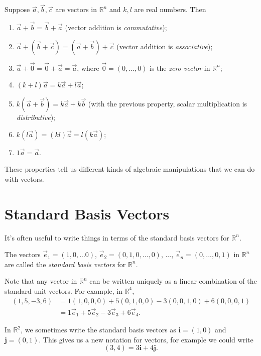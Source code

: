 \documentclass{ximera}
\begin{document}
\begin{proposition}
Suppose $\vec{a},\vec{b},\vec{c}$ are vectors in $\mathbb{R}^n$ and $k,l$ are real numbers. Then 
\begin{enumerate}
\item $\vec{a}+\vec{b} = \vec{b}+\vec{a}$ (vector addition is \emph{commutative});
\item $\vec{a}+(\vec{b}+\vec{c}) = (\vec{a}+\vec{b})+\vec{c}$ (vector addition is \emph{associative});
\item $\vec{a}+\vec{0} = \vec{0}+\vec{a} = \vec{a}$, where $\vec{0} = (0,...,0)$ is the \emph{zero vector} in $\mathbb{R}^n$;
\item $(k+l)\vec{a} = k\vec{a}+l\vec{a}$;
\item $k(\vec{a}+\vec{b}) = k\vec{a}+k\vec{b}$ (with the previous property, scalar multiplication is \emph{distributive});
\item $k(l\vec{a})=(kl)\vec{a} = l(k\vec{a})$;
\item $1\vec{a} = \vec{a}$.
\end{enumerate}
\end{proposition}

These properties tell us different kinds of algebraic manipulations that we can do with vectors.

\section{Standard Basis Vectors}

It's often useful to write things in terms of the standard basis vectors for $\mathbb{R}^n$.

\begin{definition}
The vectors $\vec{e}_1 = (1,0,...0)$, $\vec{e}_2 = (0,1,0,...,0)$, ..., $\vec{e}_n = (0,...,0,1)$ in $\mathbb{R}^n$ are called the \emph{standard basis vectors} for $\mathbb{R}^n$.
\end{definition}

Note that any vector in $\mathbb{R}^n$ can be written uniquely as a linear combination of the standard unit vectors. For example, in $\mathbb{R}^4$,
\begin{align*}
(1,5,-3,6) &= 1(1,0,0,0)+5(0,1,0,0)-3(0,0,1,0)+6(0,0,0,1)\\
&= 1\vec{e}_1+5\vec{e}_2-3\vec{e}_3+6\vec{e}_4.
\end{align*}

In $\mathbb{R}^2$, we sometimes write the standard basis vectors as $\mathbf{i} = (1,0)$ and $\mathbf{j} = (0,1)$. This gives us a new notation for vectors, for example we could write
\[
(3,4) = 3\mathbf{i}+4\mathbf{j}.
\]
\end{document}
